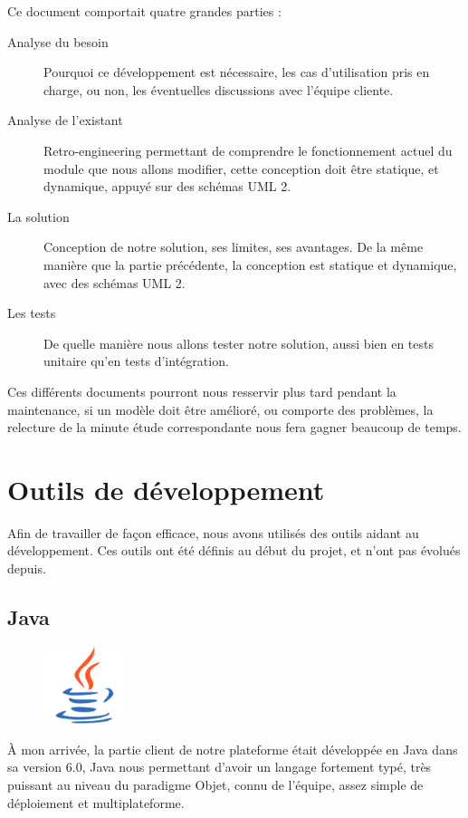 Ce document comportait quatre grandes parties : 
\begin{description}
	\item[Analyse du besoin] Pourquoi ce développement est nécessaire, les cas d'utilisation pris en charge, ou non, les éventuelles discussions avec l'équipe cliente.
	\item[Analyse de l'existant] Retro-engineering permettant de comprendre le fonctionnement actuel du module que nous allons modifier, cette conception doit être statique, et dynamique, appuyé sur des schémas UML 2.
	\item[La solution] Conception de notre solution, ses limites, ses avantages. De la même manière que la partie précédente, la conception est statique et dynamique, avec des schémas UML 2.
	\item[Les tests] De quelle manière nous allons tester notre solution, aussi bien en tests unitaire qu'en tests d'intégration.
\end{description}

Ces différents documents pourront nous resservir plus tard pendant la maintenance, si un modèle doit être amélioré, ou comporte des
problèmes, la relecture de la minute étude correspondante nous fera gagner beaucoup de temps.

\section{Outils de développement}
Afin de travailler de façon efficace, nous avons utilisés des outils aidant au développement. Ces outils ont été définis au début du projet, et n'ont pas évolués depuis.

\subsection{Java}
\begin{figure}
	\includegraphics[width=2.5cm]{contents/images/logoJava.png}
\end{figure}
À mon arrivée, la partie client de notre plateforme était développée en Java dans sa version 6.0, Java nous permettant d'avoir un langage fortement typé, très puissant au niveau du paradigme Objet, connu de l'équipe, assez simple de déploiement et multiplateforme. 

